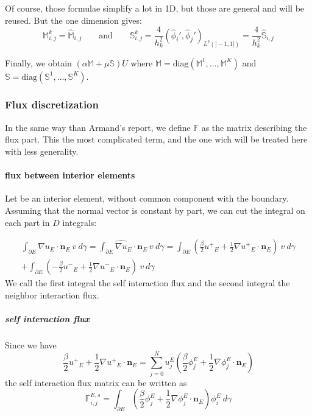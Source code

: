 \documentclass[a4paper,10pt,draft]{article}
\begin{document}
Of course, those formulae simplify a lot in 1D, but those are general and will be reused. But the 
one dimension gives:
\begin{equation*}
 \mathbb{M}^k_{i,j} =  {\widehat{\mathbb{M}}}_{i,j} \qquad \text{and} \qquad
 \mathbb{S}_{i,j}^k =  \frac{4}{h_k^2} \left( \hat \phi_i' , \hat \phi_j ' 
\right)_{L^2(]-1,1[)} = \frac{4}{h_k^2} \widehat{\mathbb{S}}_{i,j}
\end{equation*}

Finally, we obtain $(\alpha \mathbb{M} + \mu \mathbb{S})U$ where $\mathbb{M} = \mathrm{diag} ( 
\mathbb{M}^1, \dots, \mathbb{M}^K)$ and  $\mathbb{S} = \mathrm{diag} 
(\mathbb{S}^1,\dots,\mathbb{S}^K)$.

\subsubsection{Flux discretization}

In the same way than Armand's report, we define $\mathbb{F}$ as the matrix describing the flux 
part. This the most complicated term, and the one wich will be treated here with less generality.

\paragraph{flux between interior elements}

Let be an interior element, without common component with the boundary. Assuming that the normal 
vector is constant by part, we can cut the integral on each part in $D$ integrals:

\begin{multline*}
 \int_{\partial E} \widehat{\nabla u}_E \cdot \mathbf{n}_E\ v\ d\gamma 
 = \int_{\partial E} \widehat{\nabla u}_E \cdot \mathbf{n}_E\ v\ d\gamma
 = \int_{\partial E} \left( \frac{\beta}{2} {u^+}_E + \frac{1}{2} \nabla {u^+}_E \cdot \mathbf{n}_E 
\right) \ v\ d\gamma \\
+ \int_{\partial E} \left( -\frac{\beta}{2} {u^-}_E + \frac{1}{2} \nabla {u^-}_E \cdot \mathbf{n}_E 
\right) \ v\ d\gamma
\end{multline*}
 We call the first integral the self interaction flux and the second integral the neighbor 
interaction flux.

\subparagraph{self interaction flux} 
Since we have
\begin{equation*}
 \frac{\beta}{2} {u^+}_E + \frac{1}{2} \nabla {u^+}_E \cdot \mathbf{n}_E = \sum_{j=0}^N u_j^E 
\left( \frac{\beta}{2} \phi_j^E + \frac{1}{2} \nabla \phi_j^E \cdot \mathbf{n}_E \right)
\end{equation*}
the self interaction flux matrix can be written as
\begin{equation*}
 \mathbb{F}_{i,j}^{E,s} = \int_{\partial E} \left( \frac{\beta}{2} \phi_j^E + \frac{1}{2} \nabla 
\phi_j^E \cdot \mathbf{n}_E \right) \phi_i^E \ d \gamma
\end{equation*}
\end{document}
